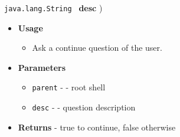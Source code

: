 \documentclass[11pt]{report}
\newcommand{\isep}[0]{%
\setlength{\itemsep}{-.4ex}
}
\newcommand{\sld}[0]{%
\setlength{\topsep}{0em}
\setlength{\partopsep}{0em}
\setlength{\parskip}{0em}
\setlength{\parsep}{-1em}
}
\begin{document}
{{{{\begin{itemize}
{{{\tt java.lang.String } {\bf desc} )
\label{l1735}\label{l1736}}%
\begin{itemize}
\sld
\item{
\sld
{\bf Usage}
  \begin{itemize}\isep
   \item{
Ask a continue question of the user.
}%
  \end{itemize}
}
\item{
\sld
{\bf Parameters}
\sld\isep
  \begin{itemize}
\sld\isep
   \item{
\sld
{\tt parent} - - root shell}
   \item{
\sld
{\tt desc} - - question description}
  \end{itemize}
}%
\item{{\bf Returns} - 
true to continue, false otherwise 
}%
\end{itemize}
}%
\end{itemize}
}
}
}
}
\end{document}
